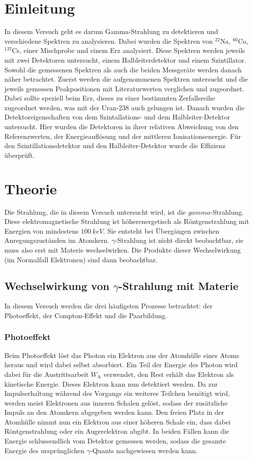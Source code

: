 \section{Einleitung}
In diesem Versuch geht es darum Gamma-Strahlung zu detektieren und verschiedene Spektren zu analysieren. Dabei wurden die Spektren von $^{22}$Na, $^{60}$Co, $^{137}$Cs, einer Mischprobe und einem Erz analysiert. Diese Spektren werden jeweils mit zwei Detektoren untersucht, einem Halbleiterdetektor und einem Szintillator. Sowohl die gemessenen Spektren als auch die beiden Messgeräte werden danach näher betrachtet. Zuerst werden die aufgenommenen Spektren untersucht und die jeweils gemessen Peakpositionen mit Literaturwerten verglichen und zugeordnet. Dabei sollte speziell beim Erz, dieses zu einer bestimmten Zerfallsreihe zugeordnet werden, was mit der Uran-238 auch gelungen ist.
Danach wurden die Detektoreigenschaften von dem Szintallations- und dem Halbleiter-Detektor untersucht. Hier wurden die Detektoren in ihrer relativen Abweichung von den Referenzwerten, der Energieauflösung und der mittleren Ionisationsenergie. Für den Szintillationsdetektor und den Halbleiter-Detektor wurde die Effizienz überprüft.




\section{Theorie}
Die Strahlung, die in diesem Versuch untersucht wird, ist die $gamma$-Strahlung. Diese elektromagnetische Strahlung ist höherenergetisch als Röntgenstrahlung mit Energien von mindestens $\SI{100}{keV}$. Sie entsteht bei Übergängen zwischen Anregungszuständen im Atomkern. $\gamma$-Strahlung ist nicht direkt beobachtbar, sie muss also erst mit Materie wechselwirken. Die Produkte dieser Wechselwirkung (im Normalfall Elektronen) sind dann beobachtbar.

\subsection{Wechselwirkung von $\gamma$-Strahlung mit Materie}
In diesem Versuch werden die drei häufigsten Prozesse betrachtet: der Photoeffekt, der Compton-Effekt und die Paarbildung.
\subsubsection{Photoeffekt}
Beim Photoeffekt löst das Photon ein Elektron aus der Atomhülle eines Atoms heraus und wird dabei selbst absorbiert. Ein Teil der Energie des Photon wird dabei für die Austrittsarbeit $W_\text{A}$ verwendet, den Rest erhält das Elektron als kinetische Energie. Dieses Elektron kann nun detektiert werden. Da zur Impulserhaltung während des Vorgangs ein weiteres Teilchen benötigt wird, werden meist Elektronen aus inneren Schalen gelöst, sodass der zusätzliche Impuls an den Atomkern abgegeben werden kann. Den freien Platz in der Atomhülle nimmt nun ein Elektron aus einer höheren Schale ein, dass dabei Röntgenstrahlung oder ein Augerelektron abgibt. In beiden Fällen kann die Energie schlussendlich vom Detektor gemessen werden, sodass die gesamte Energie des ursprünglichen $\gamma$-Quants nachgewiesen werden kann.

